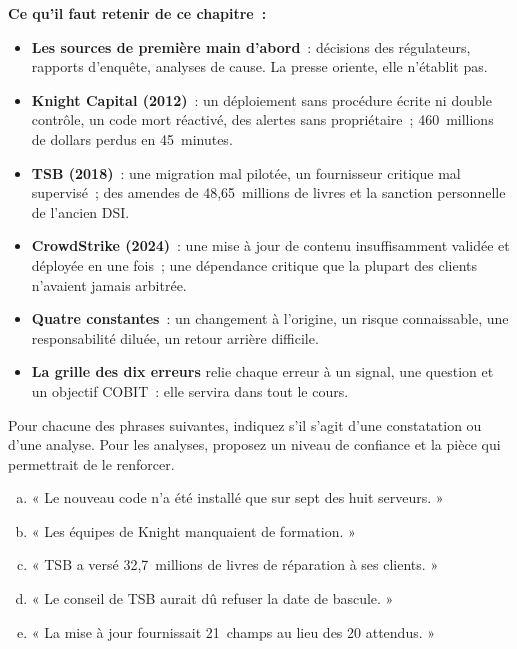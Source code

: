 \begin{boxresume}
\textbf{Ce qu'il faut retenir de ce chapitre~:}
\begin{itemize}
    \item \textbf{Les sources de première main d'abord}~: décisions des
          régulateurs, rapports d'enquête, analyses de cause. La presse
          oriente, elle n'établit pas.
    \item \textbf{Knight Capital (2012)}~: un déploiement sans procédure
          écrite ni double contrôle, un code mort réactivé, des alertes
          sans propriétaire~; 460~millions de dollars perdus en
          45~minutes.
    \item \textbf{TSB (2018)}~: une migration mal pilotée, un fournisseur
          critique mal supervisé~; des amendes de 48,65~millions de livres
          et la sanction personnelle de l'ancien DSI.
    \item \textbf{CrowdStrike (2024)}~: une mise à jour de contenu
          insuffisamment validée et déployée en une fois~; une dépendance
          critique que la plupart des clients n'avaient jamais arbitrée.
    \item \textbf{Quatre constantes}~: un changement à l'origine, un risque
          connaissable, une responsabilité diluée, un retour arrière
          difficile.
    \item \textbf{La grille des dix erreurs} relie chaque erreur à un
          signal, une question et un objectif COBIT~: elle servira dans
          tout le cours.
\end{itemize}
\end{boxresume}

\bigskip

\begin{boxexo}[title={\ding{45}\quad Exercice~2.1. Constatation ou analyse~? \niveaubase}]
Pour chacune des phrases suivantes, indiquez s'il s'agit d'une constatation
ou d'une analyse. Pour les analyses, proposez un niveau de confiance et la
pièce qui permettrait de le renforcer.
\begin{enumerate}[(a)]
    \item « Le nouveau code n'a été installé que sur sept des huit
          serveurs. »
    \item « Les équipes de Knight manquaient de formation. »
    \item « TSB a versé 32,7~millions de livres de réparation à ses
          clients. »
    \item « Le conseil de TSB aurait dû refuser la date de bascule. »
    \item « La mise à jour fournissait 21~champs au lieu des 20 attendus. »
\end{enumerate}
\end{boxexo}

